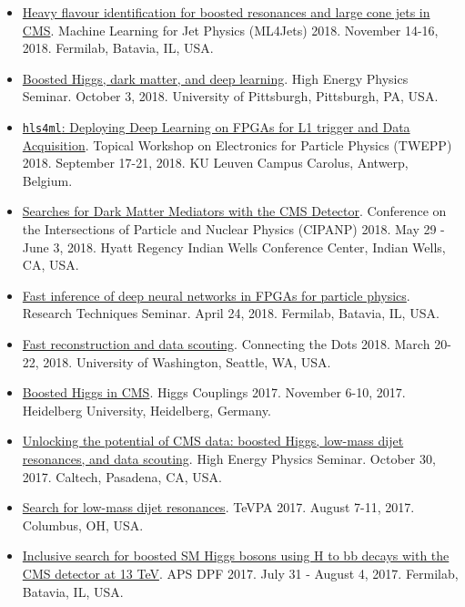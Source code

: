 \documentclass[11pt]{res}
\begin{document}
\begin{resume}
\begin{itemize}
    \item \href{https://indico.cern.ch/event/745718/contributions/3211982/}{Heavy flavour identification for boosted resonances and large cone jets in CMS}. Machine Learning for Jet Physics (ML4Jets) 2018. November 14-16, 2018. Fermilab, Batavia, IL, USA.
    \item \href{https://www.physicsandastronomy.pitt.edu/events/hep-seminar-javier-duarte-fermilab}{Boosted Higgs, dark matter, and deep learning}. High Energy Physics Seminar. October 3, 2018. University of Pittsburgh, Pittsburgh, PA, USA.
    \item \href{https://indico.cern.ch/event/697988/contributions/3055990/}{\texttt{hls4ml}: Deploying Deep Learning on FPGAs for L1 trigger and Data Acquisition}. Topical Workshop on Electronics for Particle Physics (TWEPP) 2018. September 17-21, 2018. KU Leuven Campus Carolus, Antwerp, Belgium.
    \item \href{https://conferences.lbl.gov/event/137/session/27/contribution/354}{Searches for Dark Matter Mediators with the CMS Detector}. Conference on the Intersections of Particle and Nuclear Physics (CIPANP) 2018. May 29 - June 3, 2018. Hyatt Regency Indian Wells Conference Center, Indian Wells, CA, USA.
    \item \href{https://indico.fnal.gov/event/16908/}{Fast inference of deep neural networks in FPGAs for particle physics}. Research Techniques Seminar. April 24, 2018. Fermilab, Batavia, IL, USA.
    \item \href{https://indico.cern.ch/event/658267/contributions/2881127/}{Fast reconstruction and data scouting}. Connecting the Dots 2018. March 20-22, 2018. University of Washington, Seattle, WA, USA.
    \item \href{http://www.thphys.uni-heidelberg.de/~higgs/talks/duarte.pdf}{Boosted Higgs in CMS}. Higgs Couplings 2017. November 6-10, 2017. Heidelberg University, Heidelberg, Germany.
    \item \href{https://indico.hep.caltech.edu/indico/conferenceDisplay.py?confId=149}{Unlocking the potential of CMS data: boosted Higgs, low-mass dijet resonances, and data scouting}. High Energy Physics Seminar. October 30, 2017. Caltech, Pasadena, CA, USA.
    \item \href{https://indico.cern.ch/event/615891/contributions/2666361/}{Search for low-mass dijet resonances}. TeVPA 2017. August 7-11, 2017. Columbus, OH, USA.
    \item \href{https://indico.fnal.gov/contributionDisplay.py?sessionId=14&contribId=38&confId=11999}{Inclusive search for boosted SM Higgs bosons using H to bb decays with the CMS detector at 13 TeV}. APS DPF 2017. July 31 - August 4, 2017. Fermilab, Batavia, IL, USA.

\end{itemize}
\end{resume}
\end{document}
